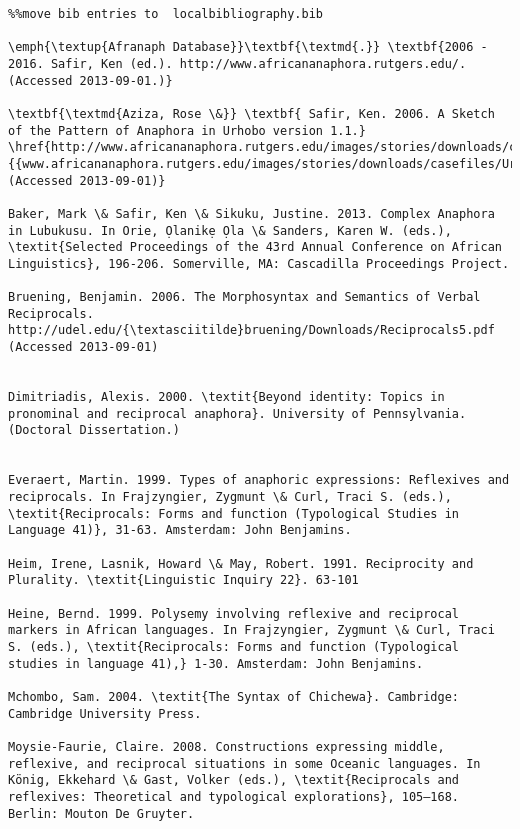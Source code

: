 \documentclass[output=paper]{langsci/langscibook}
\begin{document}
\begin{verbatim}%%move bib entries to  localbibliography.bib

\emph{\textup{Afranaph Database}}\textbf{\textmd{.}} \textbf{2006 - 2016. Safir, Ken (ed.). http://www.africananaphora.rutgers.edu/. (Accessed 2013-09-01.)}

\textbf{\textmd{Aziza, Rose \&}} \textbf{ Safir, Ken. 2006. A Sketch of the Pattern of Anaphora in Urhobo version 1.1.} \href{http://www.africananaphora.rutgers.edu/images/stories/downloads/casefiles/UrhoboAS.pdf}{{www.africananaphora.rutgers.edu/images/stories/downloads/casefiles/UrhoboAS.pdf}}\textbf{ (Accessed 2013-09-01)}

Baker, Mark \& Safir, Ken \& Sikuku, Justine. 2013. Complex Anaphora in Lubukusu. In Orie, Ọlanikẹ Ọla \& Sanders, Karen W. (eds.), \textit{Selected Proceedings of the 43rd Annual Conference on African Linguistics}, 196-206. Somerville, MA: Cascadilla Proceedings Project.

Bruening, Benjamin. 2006. The Morphosyntax and Semantics of Verbal Reciprocals. http://udel.edu/{\textasciitilde}bruening/Downloads/Reciprocals5.pdf (Accessed 2013-09-01)

 
Dimitriadis, Alexis. 2000. \textit{Beyond identity: Topics in pronominal and reciprocal anaphora}. University of Pennsylvania. (Doctoral Dissertation.)
 

Everaert, Martin. 1999. Types of anaphoric expressions: Reflexives and reciprocals. In Frajzyngier, Zygmunt \& Curl, Traci S. (eds.), \textit{Reciprocals: Forms and function (Typological Studies in Language 41)}, 31-63. Amsterdam: John Benjamins.

Heim, Irene, Lasnik, Howard \& May, Robert. 1991. Reciprocity and Plurality. \textit{Linguistic Inquiry 22}. 63-101

Heine, Bernd. 1999. Polysemy involving reflexive and reciprocal markers in African languages. In Frajzyngier, Zygmunt \& Curl, Traci S. (eds.), \textit{Reciprocals: Forms and function (Typological studies in language 41),} 1-30. Amsterdam: John Benjamins.

Mchombo, Sam. 2004. \textit{The Syntax of Chichewa}. Cambridge: Cambridge University Press. 

Moysie-Faurie, Claire. 2008. Constructions expressing middle, reflexive, and reciprocal situations in some Oceanic languages. In König, Ekkehard \& Gast, Volker (eds.), \textit{Reciprocals and reflexives: Theoretical and typological explorations}, 105–168. Berlin: Mouton De Gruyter.


\end{verbatim}
\end{document}
